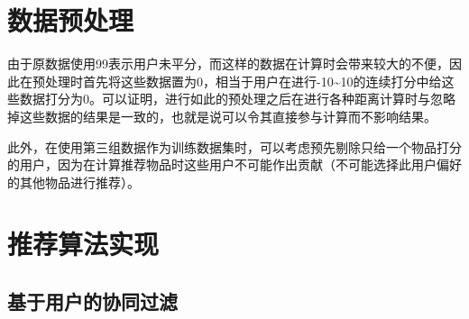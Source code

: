 \documentclass{article}
\begin{document}
\section{数据预处理}
\label{sec:shu_ju_yu_chu_li_}
\par 由于原数据使用99表示用户未平分，而这样的数据在计算时会带来较大的不便，因此在预处理时首先将这些数据置为0，相当于用户在进行-10\textasciitilde 10的连续打分中给这些数据打分为0。可以证明，进行如此的预处理之后在进行各种距离计算时与忽略掉这些数据的结果是一致的，也就是说可以令其直接参与计算而不影响结果。
\par 此外，在使用第三组数据作为训练数据集时，可以考虑预先剔除只给一个物品打分的用户，因为在计算推荐物品时这些用户不可能作出贡献（不可能选择此用户偏好的其他物品进行推荐）。

\section{推荐算法实现}
\label{sec:tui_jian_suan_fa_shi_xian_}

\subsection{基于用户的协同过滤}
\label{sub:ji_yu_yong_hu_de_xie_tong_guo_lu_}
\end{document}
